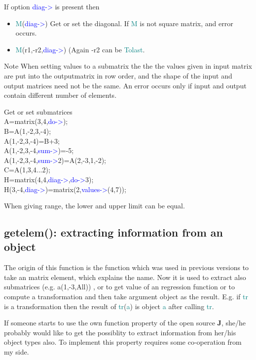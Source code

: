 If option \textcolor{blue}{diag->} is present then
\begin{itemize}
\item  \textcolor{teal}{M}(\textcolor{blue}{diag->}) Get or set the diagonal. If \textcolor{teal}{M} is not square matrix, and error
occurs.
\item  \textcolor{teal}{M}(r1,-r2,\textcolor{blue}{diag->}) (Again -r2 can be \textcolor{teal}{Tolast}.
\end{itemize}
\begin{note}
Note
When setting values to a submatrix the the the values given in input matrix
are put into the outputmatrix in row order, and the shape of the input and output matrices need
not be the same. An error occurs only if input and output contain different number of
elements.
\end{note}
\begin{example}[getset]Get or set submatrices\\
\label{getset}
A=\textcolor{VioletRed}{matrix}(3,4,\textcolor{blue}{do->});\\
B=A(1,-2,3,-4);\\
A(1,-2,3,-4)=B+3;\\
A(1,-2,3,-4,\textcolor{blue}{sum->})=-5;\\
A(1,-2,3,-4,\textcolor{blue}{sum->}2)=A(2,-3,1,-2);\\
C=A({1,3},{4...2});\\
H=\textcolor{VioletRed}{matrix}(4,4,\textcolor{blue}{diag->},\textcolor{blue}{do->}3);\\
H(3,-4,\textcolor{blue}{diag->})=\textcolor{VioletRed}{matrix}(2,\textcolor{blue}{values->}(4,7));
\end{example}
\begin{note}
When giving range, the lower and upper limit can be equal.
\end{note}
\subsection{\textcolor{VioletRed}{getelem}(): extracting information from an object}
\label{getelem0}
The origin of this function is the function which was used in previous versions
to take an matrix element, which explains the name. Now it is used to extract
also submatrices (e.g. a(1,-3,All)) , or to get value of an regression
function or to compute
a transformation and then take argument object as the result. E.g. if \textcolor{teal}{tr} is a transformation
then the result of  \textcolor{teal}{tr}(\textcolor{teal}{a}) is object \textcolor{teal}{a} after calling \textcolor{teal}{tr}.
\begin{note}
If someone starts to use the own function property of the open source \textbf{J}, she/he
probably would like to get the possiblity to extract information from her/his object types
also. To implement this property requires some co-operation from my side.
\end{note}
